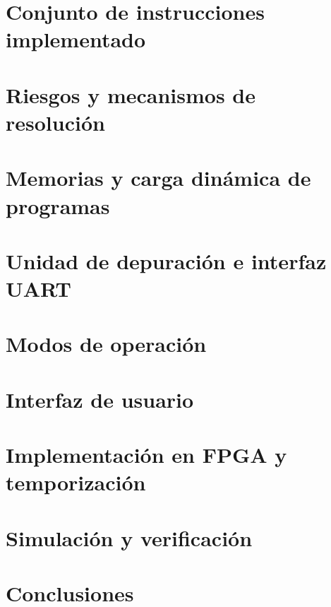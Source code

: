 \documentclass[11pt,a4paper]{article}
\begin{document}
\section{Conjunto de instrucciones implementado}

\section{Riesgos y mecanismos de resolución}

\section{Memorias y carga dinámica de programas}

\section{Unidad de depuración e interfaz UART}

\section{Modos de operación}

\section{Interfaz de usuario}

\section{Implementación en FPGA y temporización}

\section{Simulación y verificación}

\section{Conclusiones}
\end{document}
